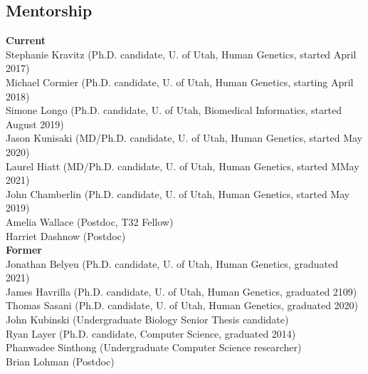 \documentclass[margin,line]{cv}
\begin{document}
\begin{resume}
    \section{\mysidestyle Mentorship}
    \textbf{Current} \\
    Stephanie Kravitz (Ph.D. candidate, U. of Utah, Human Genetics, started April 2017) \\
    Michael Cormier (Ph.D. candidate, U. of Utah, Human Genetics, starting April 2018) \\
    Simone Longo (Ph.D. candidate, U. of Utah, Biomedical Informatics, started August 2019) \\
    Jason Kunisaki  (MD/Ph.D. candidate, U. of Utah, Human Genetics, started May 2020) \\
    Laurel Hiatt  (MD/Ph.D. candidate, U. of Utah, Human Genetics, started MMay 2021) \\
    John Chamberlin  (Ph.D. candidate, U. of Utah, Human Genetics, started May 2019) \\
    Amelia Wallace (Postdoc, T32 Fellow) \\
    Harriet Dashnow (Postdoc) \\


    \textbf{Former} \\
    Jonathan Belyeu (Ph.D. candidate, U. of Utah, Human Genetics, graduated 2021) \\
    James Havrilla (Ph.D. candidate, U. of Utah, Human Genetics, graduated 2109) \\
    Thomas Sasani (Ph.D. candidate, U. of Utah, Human Genetics, graduated 2020) \\
    John Kubinski (Undergraduate Biology Senior Thesis candidate)  \\
    Ryan Layer (Ph.D. candidate, Computer Science, graduated 2014) \\
    Phanwadee Sinthong (Undergraduate Computer Science researcher) \\
    Brian Lohman (Postdoc) \\




\end{resume}
\end{document}
